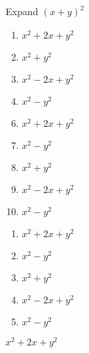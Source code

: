 

 Expand $(x+y)^2$


\ifsat
	\begin{enumerate}[label=\Alph*)]
		\item   $x^2+2x+y^2$%
		\item  $x^2+y^2$
		\item   $x^2-2x+y^2$
		\item  $x^2-y^2$
	\end{enumerate}
\else
\fi

\ifacteven
	\begin{enumerate}[label=\textbf{\Alph*.},itemsep=\fill,align=left]
		\setcounter{enumii}{5}
		\item   $x^2+2x+y^2$%
		\item  $x^2-y^2$
		\item  $x^2+y^2$
		\addtocounter{enumii}{1}
		\item   $x^2-2x+y^2$
		\item  $x^2-y^2$
	\end{enumerate}
\else
\fi

\ifactodd
	\begin{enumerate}[label=\textbf{\Alph*.},itemsep=\fill,align=left]
		\item   $x^2+2x+y^2$%
		\item  $x^2-y^2$
		\item  $x^2+y^2$
		\item   $x^2-2x+y^2$
		\item  $x^2-y^2$
	\end{enumerate}
\else
\fi

\ifgridin
   $x^2+2x+y^2$%
		
\else
\fi

